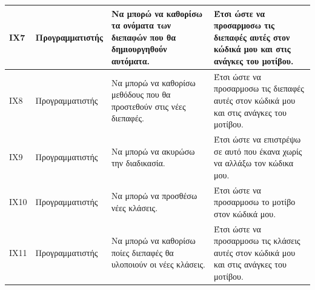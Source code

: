 \begin{table}[H]
\begin{tabular}{|p{1.5cm}|p{3.5cm}|p{4.5cm}|p{4.7cm}|}
        ΙΧ7 & Προγραμματιστής & Να μπορώ να καθορίσω τα ονόματα των διεπαφών που θα δημιουργηθούν αυτόματα. & Έτσι ώστε να προσαρμοσω τις διεπαφές αυτές στον κώδικά μου και στις ανάγκες του μοτίβου. \\ \hline
        ΙΧ8 & Προγραμματιστής & Να μπορώ να καθορίσω μεθόδους που θα προστεθούν στις νέες διεπαφές. & Έτσι ώστε να προσαρμοσω τις διεπαφές αυτές στον κώδικά μου και στις ανάγκες του μοτίβου. \\ \hline
        ΙΧ9 & Προγραμματιστής & Να μπορώ να ακυρώσω την διαδικασία. & Έτσι ώστε να επιστρέψω σε αυτό που έκανα χωρίς να αλλάξω τον κώδικα μου. \\ \hline
		ΙΧ10 & Προγραμματιστής & Να μπορώ να προσθέσω νέες κλάσεις. & Έτσι ώστε να προσαρμοσω το μοτίβο στον κώδικά μου. \\ \hline
		ΙΧ11 & Προγραμματιστής & Να μπορώ να καθορίσω ποίες διεπαφές θα υλοποιούν οι νέες κλάσεις. & Έτσι ώστε να προσαρμοσω τις κλάσεις αυτές στον κώδικά μου και στις ανάγκες του μοτίβου. \\ \hline
    \end{tabular}
\end{table}
